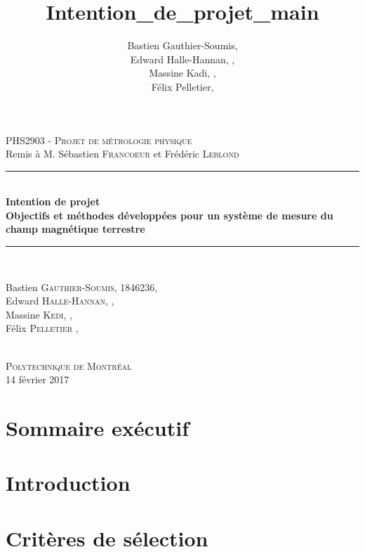 \documentclass[11pt,a4paper]{article}
\author{Bastien Gauthier-Soumis,\\
 Edward Halle-Hannan, ,\\
Massine Kadi, ,\\
Félix Pelletier, }
\title{Intention_de_projet_main}
\begin{document}
\begin{titlepage}
	\begin{flushright}
\def\logoscale{0.5}


\end{flushright}
\begin{center}
	\textsc{\Large{PHS2903 - Projet de métrologie physique}}\\
    \large{Remis à M. Sébastien \textsc{Francoeur} et Frédéric \textsc{Leblond}  }\\
    [1.5cm]
	\rule{\linewidth}{0.5mm} \\ %
	[0.4cm]
    \Large{\bfseries Intention de projet} \\
	\huge{\bfseries Objectifs et méthodes développées pour un système de mesure du champ magnétique terrestre} \\
	[0.4cm]
   
	\rule{\linewidth}{0.5mm} \\ %
	[1.5cm]
	\begin{minipage}{10cm}
		\begin{center}
		\large{Bastien \textsc{Gauthier-Soumis}, 1846236,\\
		 Edward \textsc{Halle-Hannan}, ,\\
		Massine \textsc{Kedi}, ,\\
		Félix \textsc{Pelletier} ,\\}
		
      
		\end{center}
	\end{minipage}
	~\\
	[1.5cm]
	\vfill
	\textsc{\Large{Polytechnique de Montréal}}\\ 
	\Large{14 février 2017}\\%
\end{center}
\end{titlepage}


\section{Sommaire exécutif}

\section{Introduction}



\section{Critères de sélection}

\end{document}
